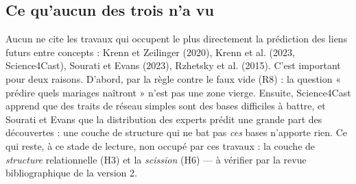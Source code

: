 \documentclass[a4paper,11pt]{article}
\begin{document}
\subsection{Ce qu'aucun des trois n'a vu}
Aucun ne cite les travaux qui occupent le plus directement la prédiction des liens futurs entre concepts : Krenn et Zeilinger (2020), Krenn et al. (2023, Science4Cast), Sourati et Evans (2023), Rzhetsky et al. (2015). C'est important pour deux raisons. D'abord, par la règle contre le faux vide (R8) : la question « prédire quels mariages naîtront » n'est pas une zone vierge. Ensuite, Science4Cast apprend que des traits de réseau simples sont des bases difficiles à battre, et Sourati et Evans que la distribution des experts prédit une grande part des découvertes : une couche de structure qui ne bat pas \emph{ces} bases n'apporte rien. Ce qui reste, à ce stade de lecture, non occupé par ces travaux : la couche de \emph{structure} relationnelle (H3) et la \emph{scission} (H6) — à vérifier par la revue bibliographique de la version 2.
\end{document}

